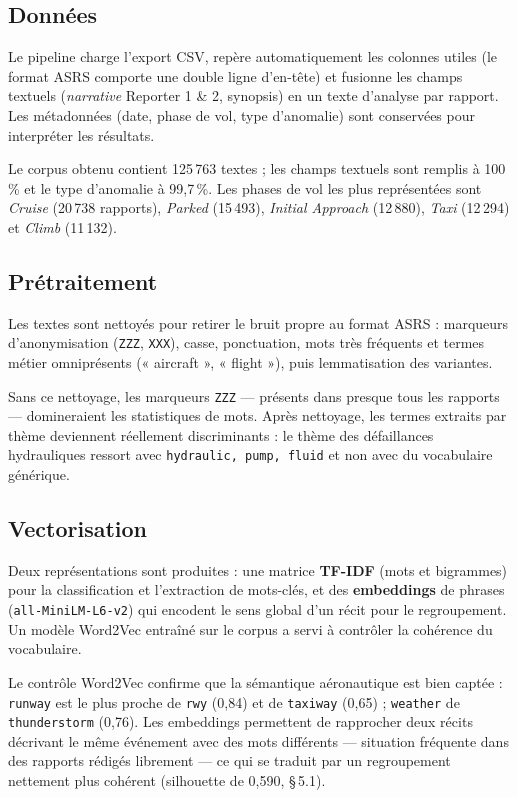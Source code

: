 \documentclass[11pt,a4paper]{article}
\newcommand{\exemple}[1]{\par\noindent #1}
\begin{document}
\subsection{Données}
Le pipeline charge l'export CSV, repère automatiquement les colonnes utiles (le format ASRS
comporte une double ligne d'en-tête) et fusionne les champs textuels (\emph{narrative}
Reporter 1 \& 2, synopsis) en un texte d'analyse par rapport. Les métadonnées (date, phase de
vol, type d'anomalie) sont conservées pour interpréter les résultats.
\exemple{Le corpus obtenu contient 125\,763 textes ; les champs textuels sont remplis à
100\,\% et le type d'anomalie à 99,7\,\%. Les phases de vol les plus représentées sont
\emph{Cruise} (20\,738 rapports), \emph{Parked} (15\,493), \emph{Initial Approach}
(12\,880), \emph{Taxi} (12\,294) et \emph{Climb} (11\,132).}

\subsection{Prétraitement}
Les textes sont nettoyés pour retirer le bruit propre au format ASRS : marqueurs
d'anonymisation (\texttt{ZZZ}, \texttt{XXX}), casse, ponctuation, mots très fréquents et
termes métier omniprésents (« aircraft », « flight »), puis lemmatisation des variantes.
\exemple{Sans ce nettoyage, les marqueurs \texttt{ZZZ} — présents dans presque tous les
rapports — domineraient les statistiques de mots. Après nettoyage, les termes extraits par
thème deviennent réellement discriminants : le thème des défaillances hydrauliques ressort
avec \texttt{hydraulic, pump, fluid} et non avec du vocabulaire générique.}

\subsection{Vectorisation}
Deux représentations sont produites : une matrice \textbf{TF-IDF} (mots et bigrammes) pour la
classification et l'extraction de mots-clés, et des \textbf{embeddings} de phrases
(\texttt{all-MiniLM-L6-v2}) qui encodent le sens global d'un récit pour le regroupement. Un
modèle Word2Vec entraîné sur le corpus a servi à contrôler la cohérence du vocabulaire.
\exemple{Le contrôle Word2Vec confirme que la sémantique aéronautique est bien captée :
\texttt{runway} est le plus proche de \texttt{rwy} (0,84) et de \texttt{taxiway} (0,65) ;
\texttt{weather} de \texttt{thunderstorm} (0,76). Les embeddings permettent de rapprocher
deux récits décrivant le même événement avec des mots différents — situation fréquente dans
des rapports rédigés librement — ce qui se traduit par un regroupement nettement plus
cohérent (silhouette de 0,590, \S\,5.1).}
\end{document}
